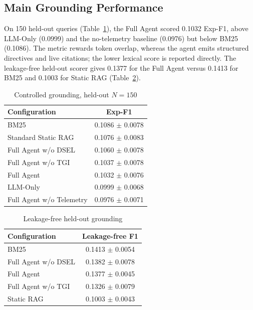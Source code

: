 \documentclass[conference]{IEEEtran}
\begin{document}
\subsection{Main Grounding Performance}
On 150 held-out queries (Table~\ref{tab:cohort}), the Full Agent scored 0.1032 Exp-F1, above LLM-Only (0.0999) and the no-telemetry baseline (0.0976) but below BM25 (0.1086). The metric rewards token overlap, whereas the agent emits structured directives and live citations; the lower lexical score is reported directly. The leakage-free held-out scorer gives 0.1377 for the Full Agent versus 0.1413 for BM25 and 0.1003 for Static RAG (Table~\ref{tab:main}).
\begin{table}[t]
\caption{Controlled grounding, held-out $N=150$}
\label{tab:cohort}
\centering\scriptsize\setlength{\tabcolsep}{3pt}
\begin{tabular*}{\columnwidth}{@{\extracolsep{\fill}}lc@{}}
\toprule
Configuration & Exp-F1 \\
\midrule
BM25 & 0.1086 $\pm$ 0.0078 \\
Standard Static RAG & 0.1076 $\pm$ 0.0083 \\
Full Agent w/o DSEL & 0.1060 $\pm$ 0.0078 \\
Full Agent w/o TGI & 0.1037 $\pm$ 0.0078 \\
Full Agent & 0.1032 $\pm$ 0.0076 \\
LLM-Only & 0.0999 $\pm$ 0.0068 \\
Full Agent w/o Telemetry & 0.0976 $\pm$ 0.0071 \\
\bottomrule
\end{tabular*}
\end{table}
\begin{table}[t]
\caption{Leakage-free held-out grounding}
\label{tab:main}
\centering\scriptsize\setlength{\tabcolsep}{3pt}
\begin{tabular*}{\columnwidth}{@{\extracolsep{\fill}}lc@{}}
\toprule
Configuration & Leakage-free F1 \\
\midrule
BM25 & 0.1413 $\pm$ 0.0054 \\
Full Agent w/o DSEL & 0.1382 $\pm$ 0.0078 \\
Full Agent & 0.1377 $\pm$ 0.0045 \\
Full Agent w/o TGI & 0.1326 $\pm$ 0.0079 \\
Static RAG & 0.1003 $\pm$ 0.0043 \\
\bottomrule
\end{tabular*}
\end{table}
\end{document}
